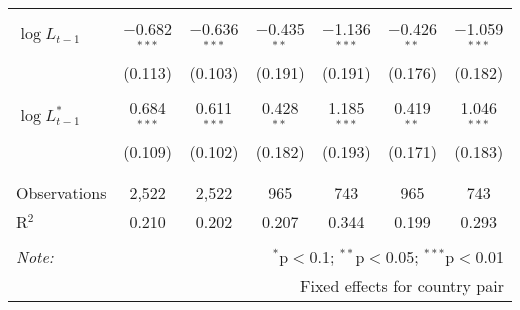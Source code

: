 \begin{tabular}{@{\extracolsep{5pt}}lcccccc}
  & & & & & & \\ 
 $\log L_{t-1}$ & $-$0.682$^{***}$ & $-$0.636$^{***}$ & $-$0.435$^{**}$ & $-$1.136$^{***}$ & $-$0.426$^{**}$ & $-$1.059$^{***}$ \\ 
  & (0.113) & (0.103) & (0.191) & (0.191) & (0.176) & (0.182) \\ 
  & & & & & & \\ 
 $\log L_{t-1}^*$ & 0.684$^{***}$ & 0.611$^{***}$ & 0.428$^{**}$ & 1.185$^{***}$ & 0.419$^{**}$ & 1.046$^{***}$ \\ 
  & (0.109) & (0.102) & (0.182) & (0.193) & (0.171) & (0.183) \\ 
  & & & & & & \\ 
\hline \\[-1.8ex] 
Observations & 2,522 & 2,522 & 965 & 743 & 965 & 743 \\ 
R$^{2}$ & 0.210 & 0.202 & 0.207 & 0.344 & 0.199 & 0.293 \\ 
\hline 
\hline \\[-1.8ex] 
\textit{Note:}  & \multicolumn{6}{r}{$^{*}$p$<$0.1; $^{**}$p$<$0.05; $^{***}$p$<$0.01} \\ 
 & \multicolumn{6}{r}{Fixed effects for country pair} \\ 
\end{tabular} 
